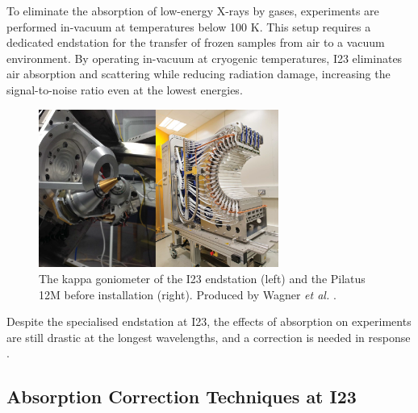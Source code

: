 To eliminate the absorption of low-energy X-rays by gases, experiments are performed in-vacuum at temperatures below 100 K. This setup requires a dedicated endstation for the transfer of frozen samples from air to a vacuum environment. By operating in-vacuum at cryogenic temperatures, I23 eliminates air absorption and scattering while reducing radiation damage, increasing the signal-to-noise ratio even at the lowest energies.

\begin{figure}
    \centering
    \includegraphics[width = 0.7\textwidth]{images/goniometer&detector.PNG}
    \caption{The kappa goniometer of the I23 endstation (left) and the Pilatus 12M before installation (right). Produced by Wagner \textit{et al.} \cite{Wagner2016}.}
    \label{fig:gonio_and_detector}
\end{figure}


Despite the specialised endstation at I23, the effects of absorption on experiments are still drastic at the longest wavelengths, and a correction is needed in response \cite{Kazantsev2021}.

\subsection{Absorption Correction Techniques at I23}



